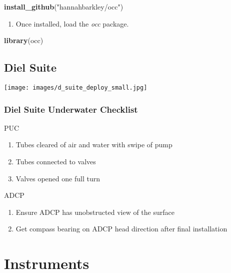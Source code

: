 \documentclass[]{book}
\newenvironment{Shaded}{\begin{snugshade}}{\end{snugshade}}
\newcommand{\KeywordTok}[1]{\textcolor[rgb]{0.13,0.29,0.53}{\textbf{#1}}}
\newcommand{\StringTok}[1]{\textcolor[rgb]{0.31,0.60,0.02}{#1}}
\newcommand{\NormalTok}[1]{#1}
\providecommand{\tightlist}{%
  \setlength{\itemsep}{0pt}\setlength{\parskip}{0pt}}
\begin{document}
\begin{Shaded}
\begin{Highlighting}[]
\KeywordTok{install_github}\NormalTok{(}\StringTok{"hannahbarkley/occ"}\NormalTok{)}
\end{Highlighting}
\end{Shaded}

\begin{enumerate}
\def\labelenumi{\arabic{enumi}.}
\setcounter{enumi}{2}
\tightlist
\item
  Once installed, load the \emph{occ} package.
\end{enumerate}

\begin{Shaded}
\begin{Highlighting}[]
\KeywordTok{library}\NormalTok{(occ)}
\end{Highlighting}
\end{Shaded}

\hypertarget{dielsuite}{\chapter{Diel Suite}\label{dielsuite}}

\texttt{[image: images/d\_suite\_deploy\_small.jpg]}

\section{Diel Suite Underwater
Checklist}\label{diel-suite-underwater-checklist}

PUC

\begin{enumerate}
\def\labelenumi{\arabic{enumi}.}
\tightlist
\item
  Tubes cleared of air and water with swipe of pump
\item
  Tubes connected to valves
\item
  Valves opened one full turn
\end{enumerate}

ADCP

\begin{enumerate}
\def\labelenumi{\arabic{enumi}.}
\tightlist
\item
  Ensure ADCP has unobstructed view of the surface
\item
  Get compass bearing on ADCP head direction after final installation
\end{enumerate}

\part*{Instruments}\label{part-instruments}
\end{document}
